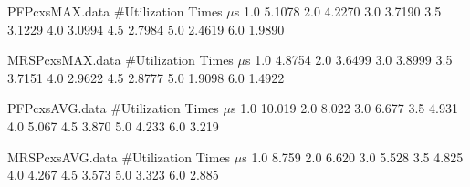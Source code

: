 \begin{filecontents}{PFPcxsMAX.data}
#Utilization   Times $\mu$s
1.0  5.1078
2.0  4.2270
3.0  3.7190
3.5  3.1229
4.0  3.0994
4.5  2.7984
5.0  2.4619
6.0  1.9890
\end{filecontents}

\begin{filecontents}{MRSPcxsMAX.data}
#Utilization   Times $\mu$s
1.0  4.8754
2.0  3.6499
3.0  3.8999
3.5  3.7151
4.0  2.9622
4.5  2.8777
5.0  1.9098
6.0  1.4922
\end{filecontents}

\begin{filecontents}{PFPcxsAVG.data}
#Utilization   Times $\mu$s
1.0  10.019
2.0  8.022
3.0  6.677
3.5  4.931
4.0  5.067
4.5  3.870
5.0  4.233 
6.0  3.219
\end{filecontents}

\begin{filecontents}{MRSPcxsAVG.data}
#Utilization   Times $\mu$s
1.0  8.759
2.0  6.620
3.0  5.528
3.5  4.825
4.0  4.267
4.5  3.573
5.0  3.323
6.0  2.885
\end{filecontents}
